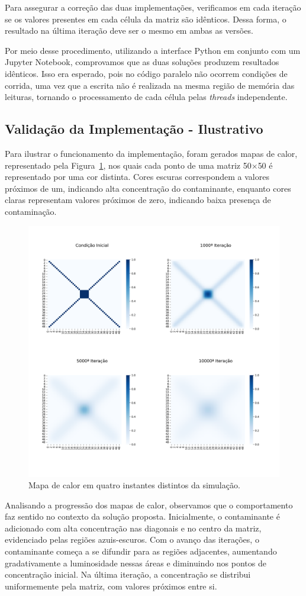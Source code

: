 \documentclass[12pt]{article}
\begin{document}
Para assegurar a correção das duas implementações, verificamos em cada iteração
se os valores presentes em cada célula da matriz são idênticos. Dessa forma, o
resultado na última iteração deve ser o mesmo em ambas as versões.

Por meio desse procedimento, utilizando a interface Python em conjunto com um
Jupyter Notebook, comprovamos que as duas soluções produzem resultados
idênticos. Isso era esperado, pois no código paralelo não ocorrem condições de
corrida, uma vez que a escrita não é realizada na mesma região de memória das
leituras, tornando o processamento de cada célula pelas \textit{threads}
independente.

\subsection{Validação da Implementação - Ilustrativo}

Para ilustrar o funcionamento da implementação, foram gerados mapas de calor,
representado pela Figura~\ref{fig:heatmap}, nos quais cada ponto de uma matriz
50$\times$50 é representado por uma cor distinta. Cores escuras correspondem a
valores próximos de um, indicando alta concentração do contaminante, enquanto
cores claras representam valores próximos de zero, indicando baixa presença de
contaminação.

\begin{figure}[ht]
  \centering
  \includegraphics[width=.5\textwidth]{figs/heatmap.png}
  \caption{Mapa de calor em quatro instantes distintos da simulação.}\label{fig:heatmap}
\end{figure}

Analisando a progressão dos mapas de calor, observamos que o comportamento faz
sentido no contexto da solução proposta. Inicialmente, o contaminante é
adicionado com alta concentração nas diagonais e no centro da matriz,
evidenciado pelas regiões azuis-escuros. Com o avanço das iterações, o
contaminante começa a se difundir para as regiões adjacentes, aumentando
gradativamente a luminosidade nessas áreas e diminuindo nos pontos de
concentração inicial. Na última iteração, a concentração se distribui
uniformemente pela matriz, com valores próximos entre si.
\end{document}
